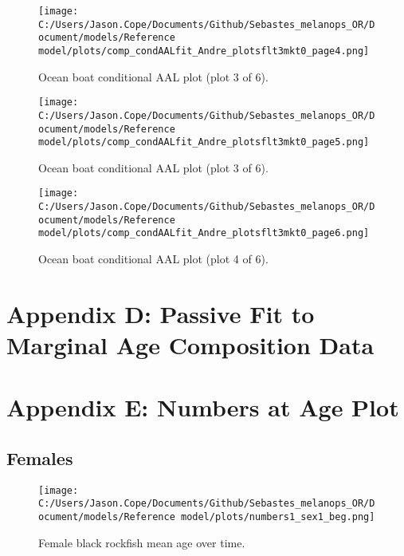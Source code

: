 \documentclass[11pt,
  english,
  letterpaper,
]{article}
\begin{document}
\begin{figure}
\centering
\texttt{[image: C:/Users/Jason.Cope/Documents/Github/Sebastes\_melanops\_OR/Document/models/Reference model/plots/comp\_condAALfit\_Andre\_plotsflt3mkt0\_page4.png]}
\caption{Ocean boat conditional AAL plot (plot 3 of 6).\label{fig:comp_condAALfit_Andre_plotsflt3mkt0_page4}}
\end{figure}

\begin{figure}
\centering
\texttt{[image: C:/Users/Jason.Cope/Documents/Github/Sebastes\_melanops\_OR/Document/models/Reference model/plots/comp\_condAALfit\_Andre\_plotsflt3mkt0\_page5.png]}
\caption{Ocean boat conditional AAL plot (plot 3 of 6).\label{fig:comp_condAALfit_Andre_plotsflt3mkt0_page5}}
\end{figure}

\begin{figure}
\centering
\texttt{[image: C:/Users/Jason.Cope/Documents/Github/Sebastes\_melanops\_OR/Document/models/Reference model/plots/comp\_condAALfit\_Andre\_plotsflt3mkt0\_page6.png]}
\caption{Ocean boat conditional AAL plot (plot 4 of 6).\label{fig:comp_condAALfit_Andre_plotsflt3mkt0_page6}}
\end{figure}

\clearpage

\hypertarget{app-d}{%
\section{Appendix D: Passive Fit to Marginal Age Composition Data}\label{app-d}}

\clearpage

\hypertarget{app-e}{%
\section{Appendix E: Numbers at Age Plot}\label{app-e}}

\hypertarget{females}{%
\subsection{Females}\label{females}}

\begin{figure}
\centering
\texttt{[image: C:/Users/Jason.Cope/Documents/Github/Sebastes\_melanops\_OR/Document/models/Reference model/plots/numbers1\_sex1\_beg.png]}
\caption{Female black rockfish mean age over time.\label{fig:num_age_females}}
\end{figure}
\end{document}
